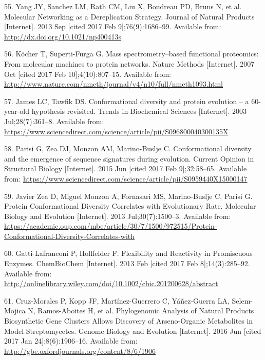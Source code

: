 \documentclass[12pt,twoside]{reedthesis}
\begin{document}
  \hypertarget{ref-yang_molecular_2013}{}
  55. Yang JY, Sanchez LM, Rath CM, Liu X, Boudreau PD, Bruns N, et al.
  Molecular Networking as a Dereplication Strategy. Journal of Natural
  Products {[}Internet{]}. 2013 Sep {[}cited 2017 Feb 9{]};76(9):1686--99.
  Available from: \url{http://dx.doi.org/10.1021/np400413s}
  
  \hypertarget{ref-kocher_mass_2007}{}
  56. Köcher T, Superti-Furga G. Mass spectrometry--based functional
  proteomics: From molecular machines to protein networks. Nature Methods
  {[}Internet{]}. 2007 Oct {[}cited 2017 Feb 10{]};4(10):807--15.
  Available from:
  \url{http://www.nature.com/nmeth/journal/v4/n10/full/nmeth1093.html}
  
  \hypertarget{ref-james_conformational_2003}{}
  57. James LC, Tawfik DS. Conformational diversity and protein evolution
  -- a 60-year-old hypothesis revisited. Trends in Biochemical Sciences
  {[}Internet{]}. 2003 Jul;28(7):361--8. Available from:
  \url{https://www.sciencedirect.com/science/article/pii/S096800040300135X}
  
  \hypertarget{ref-parisi_conformational_2015}{}
  58. Parisi G, Zea DJ, Monzon AM, Marino-Buslje C. Conformational
  diversity and the emergence of sequence signatures during evolution.
  Current Opinion in Structural Biology {[}Internet{]}. 2015 Jun {[}cited
  2017 Feb 9{]};32:58--65. Available from:
  \url{https://www.sciencedirect.com/science/article/pii/S0959440X15000147}
  
  \hypertarget{ref-javier_zea_protein_2013}{}
  59. Javier Zea D, Miguel Monzon A, Fornasari MS, Marino-Buslje C, Parisi
  G. Protein Conformational Diversity Correlates with Evolutionary Rate.
  Molecular Biology and Evolution {[}Internet{]}. 2013 Jul;30(7):1500--3.
  Available from:
  \url{https://academic.oup.com/mbe/article/30/7/1500/972515/Protein-Conformational-Diversity-Correlates-with}
  
  \hypertarget{ref-gatti-lafranconi_flexibility_2013}{}
  60. Gatti-Lafranconi P, Hollfelder F. Flexibility and Reactivity in
  Promiscuous Enzymes. ChemBioChem {[}Internet{]}. 2013 Feb {[}cited 2017
  Feb 8{]};14(3):285--92. Available from:
  \url{http://onlinelibrary.wiley.com/doi/10.1002/cbic.201200628/abstract}
  
  \hypertarget{ref-cruz-morales_phylogenomic_2016}{}
  61. Cruz-Morales P, Kopp JF, Martínez-Guerrero C, Yáñez-Guerra LA,
  Selem-Mojica N, Ramos-Aboites H, et al. Phylogenomic Analysis of Natural
  Products Biosynthetic Gene Clusters Allows Discovery of Arseno-Organic
  Metabolites in Model Streptomycetes. Genome Biology and Evolution
  {[}Internet{]}. 2016 Jun {[}cited 2017 Jan 24{]};8(6):1906--16.
  Available from: \url{http://gbe.oxfordjournals.org/content/8/6/1906}
  
\end{document}
